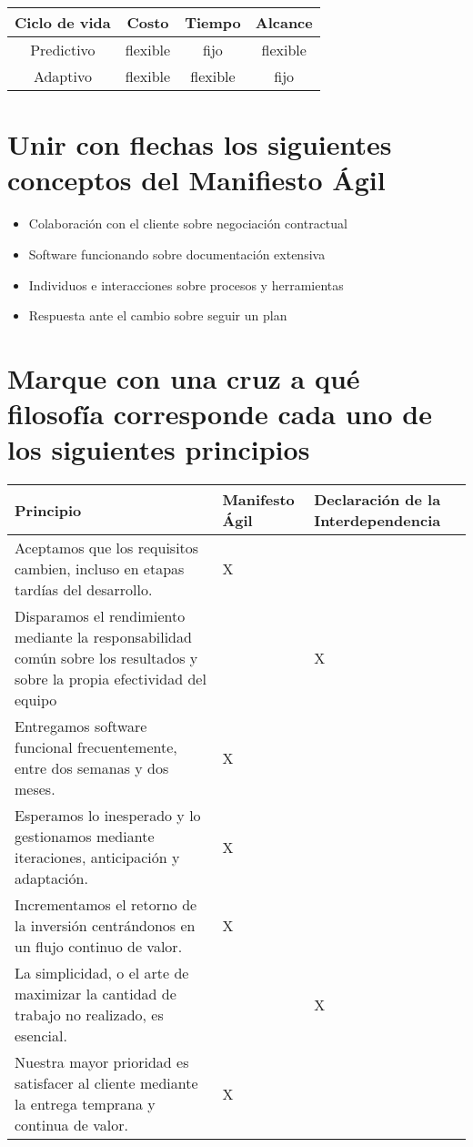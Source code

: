 \documentclass{article}
\begin{document}
\begin{center}
\begin{tabular}{ | c | c | c | c |  }
	\hline
	Ciclo de vida & Costo & Tiempo & Alcance \\\hline
	Predictivo & flexible & fijo & flexible \\
	Adaptivo & flexible & flexible & fijo \\\hline
\end{tabular}
\end{center}

\section{Unir con flechas los siguientes conceptos del Manifiesto Ágil}
\begin{itemize}
	\item Colaboración con el cliente \textrightarrow  sobre negociación contractual
	\item Software funcionando \textrightarrow sobre documentación extensiva
	\item Individuos e interacciones \textrightarrow sobre procesos y herramientas
	\item Respuesta ante el cambio \textrightarrow	sobre seguir un plan
\end{itemize}
\section{Marque con una cruz a qué filosofía corresponde 
cada uno de los siguientes principios}

\begin{tabular}{  | m{11cm} | m{2cm} | m{2cm} | }
	\hline
	Principio & Manifesto Ágil & Declaración de la Interdependencia \\\hline
	\parbox[t]{11cm}{
		Aceptamos que los requisitos cambien, incluso
		en etapas tardías del desarrollo.
	} & X &   \\\hline
	\parbox[t]{11cm}{
		Disparamos el rendimiento mediante la 
		responsabilidad común sobre los resultados
		y sobre la propia efectividad del equipo
	} &   & X \\\hline
	\parbox[t]{11cm}{
		Entregamos software funcional frecuentemente,
		entre dos semanas y dos meses.
	} & X &   \\\hline
	\parbox[t]{11cm}{
		Esperamos lo inesperado y lo gestionamos 
		mediante iteraciones, anticipación y 
		adaptación.
	} & X &   \\\hline
	\parbox[t]{11cm}{
		Incrementamos el retorno de la inversión 
		centrándonos en un flujo continuo de valor.
	} & X &   \\\hline
	\parbox[t]{11cm}{
		La simplicidad, o el arte de maximizar la
		cantidad de trabajo no realizado, es esencial.
	} &   & X \\\hline
	\parbox[t]{11cm}{
		Nuestra mayor prioridad es satisfacer 
		al cliente mediante la entrega temprana y 
		continua de valor.
	} & X &   \\\hline
\end{tabular}
\end{document}
